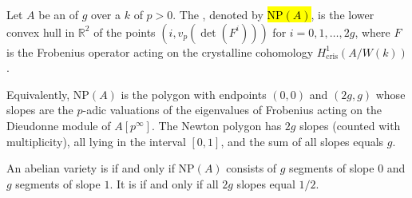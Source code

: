 \begin{definition} \label{definition:newton_polygon_of_an_abelian_variety_over_a_field_of_prime_characteristic}
    Let $A$ be an  of  $g$ over a  $k$ of  $p > 0$. 
    The , denoted by \hl{$\mathrm{NP}(A)$}, is the lower convex hull in $\mathbb{R}^2$ of the points $(i, v_p(\det(F^i)))$ for $i = 0, 1, \dots, 2g$, where $F$ is the Frobenius operator acting on the crystalline cohomology $H^1_{\mathrm{cris}}(A/W(k))$.

    Equivalently, $\mathrm{NP}(A)$ is the polygon with endpoints $(0, 0)$ and $(2g, g)$ whose slopes are the $p$-adic valuations of the eigenvalues of Frobenius acting on the Dieudonne module of $A[p^\infty]$. The Newton polygon has $2g$ slopes (counted with multiplicity), all lying in the interval $[0, 1]$, and the sum of all slopes equals $g$.

    An abelian variety is  if and only if $\mathrm{NP}(A)$ consists of $g$ segments of slope $0$ and $g$ segments of slope $1$. It is  if and only if all $2g$ slopes equal $1/2$.
\end{definition}
